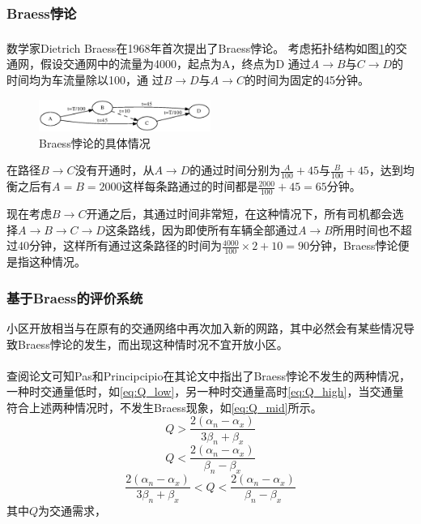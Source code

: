 \documentclass[fontset=windows,a4paper,12pt]{ctexart}
\newcommand{\upcite}[1]{\textsuperscript{\textsuperscript{\cite{#1}}}}
\begin{document}
		\subsubsection{Braess悖论}
			数学家Dietrich Braess在1968年首次提出了Braess悖论\upcite{Braess1968Ü}。
			考虑拓扑结构如图\ref{fig:braess}的交通网，假设交通网中的流量为4000，起点为A，终点为D
			通过$ A \rightarrow B $与$ C \rightarrow D $的时间均为车流量除以100，通
			过$ B \rightarrow D $与$ A \rightarrow C $的时间为固定的45分钟。
			\begin{figure}[!htbp]
				\centering
				\includegraphics[width=0.5\textwidth]{pic/braess.eps}
				\caption{Braess悖论的具体情况}
				\label{fig:braess}
			\end{figure}
			在路径$ B \rightarrow C $没有开通时，从$ A \rightarrow D $的通过时间分别为$ \frac{A}{100}+45 $与$ \frac{B}
			{100} + 45 $，达到均衡之后有$ A=B=2000 $这样每条路通过的时间都是$ \frac{2000}{100}
			+45=65 $分钟。
			
			现在考虑$ B \rightarrow C $开通之后，其通过时间非常短，在这种情况下，所有司机都会选择$ A \rightarrow B \rightarrow C \rightarrow D $这条路线，因为即使所有车辆全部通过$ A \rightarrow B $所用时间也不超过40分钟，这样所有通过这条路径的时间为$ \frac{4000}{100}\times 2+10=90$分钟，Braess悖论便是指这种情况。
		\subsubsection{基于Braess的评价系统}
			小区开放相当与在原有的交通网络中再次加入新的网路，其中必然会有某些情况导致Braess悖论的发生，而出现这种情时况不宜开放小区。
			
			查阅论文可知Pas和Principcipio在其论文中指出了Braess悖论不发生的两种情况\upcite{pas1997braess}，一种时交通量低时，如\ref{eq:Q_low}，另一种时交通量高时\ref{eq:Q_high}，当交通量符合上述两种情况时，不发生Braess现象，如\ref{eq:Q_mid}所示。
			\begin{equation}
				Q>\frac{2(\alpha_n-\alpha_x)}{3\beta_n+\beta_x}
				\label{eq:Q_low}
			\end{equation}
			\begin{equation}
				Q<\frac{2(\alpha_n-\alpha_x)}{\beta_n-\beta_x}
				\label{eq:Q_high}
			\end{equation}
			\begin{equation}
				\frac{2(\alpha_n-\alpha_x)}{3\beta_n+\beta_x}<Q<\frac{2(\alpha_n-\alpha_x)}{\beta_n-\beta_x}
				\label{eq:Q_mid}
			\end{equation}
			其中$ Q $为交通需求，
\end{document}
